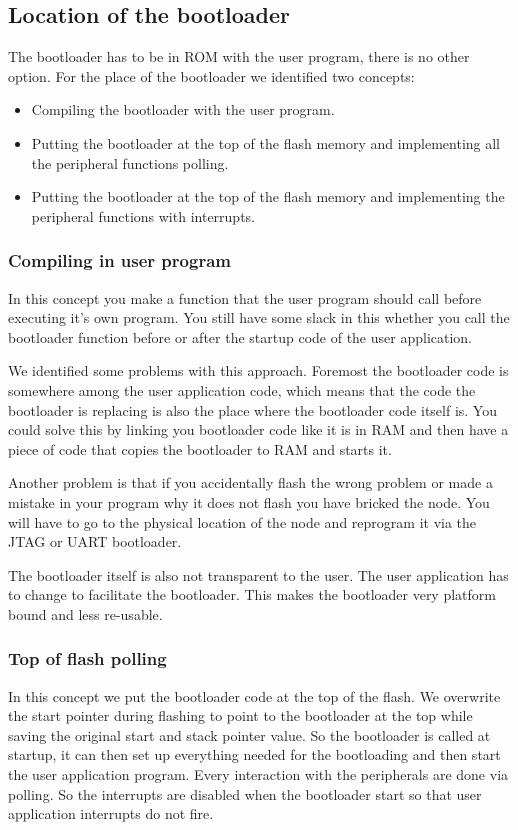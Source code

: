 \documentclass[twocolumn]{article}
\begin{document}
	\subsection*{Location of the bootloader}
		The bootloader has to be in ROM with the user program, there is no other option.
		For the place of the bootloader we identified two concepts:
		\begin{itemize}
			\item Compiling the bootloader with the user program.
			\item Putting the bootloader at the top of the flash memory and implementing all the peripheral functions polling.
			\item Putting the bootloader at the top of the flash memory and implementing the peripheral functions with interrupts.
		\end{itemize}
		
		\subsubsection*{Compiling in user program}
			In this concept you make a function that the user program should call before executing it's own program.
			You still have some slack in this whether you call the bootloader function before or after the startup code of the user application.
			
			We identified some problems with this approach.
			Foremost the bootloader code is somewhere among the user application code,
			which means that the code the bootloader is replacing is also the place where the bootloader code itself is.
			You could solve this by linking you bootloader code like it is in RAM and then have a piece of code that copies the bootloader to RAM and starts it.
			
			Another problem is that if you accidentally flash the wrong problem or made a mistake in your program why it does not flash you have bricked the node.
			You will have to go to the physical location of the node and reprogram it via the JTAG or UART bootloader.
			
			The bootloader itself is also not transparent to the user.
			The user application has to change to facilitate the bootloader.
			This makes the bootloader very platform bound and less re-usable.
		
		\subsubsection*{Top of flash polling}
			In this concept we put the bootloader code at the top of the flash.
			We overwrite the start pointer during flashing to point to the bootloader at the top while saving the original start and stack pointer value.
			So the bootloader is called at startup,
			it can then set up everything needed for the bootloading and then start the user application program.
			Every interaction with the peripherals are done via polling.
			So the interrupts are disabled when the bootloader start so that user application interrupts do not fire.
			
\end{document}

